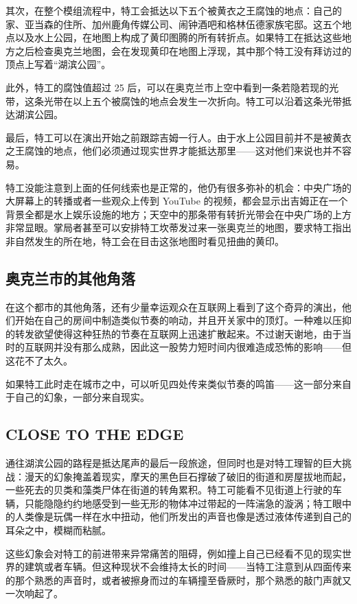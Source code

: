 其次，在整个模组流程中，特工会抵达以下五个被黄衣之王腐蚀的地点：自己的家、亚当森的住所、加州鹿角传媒公司、闹钟酒吧和格林伍德家族宅邸。这五个地点以及水上公园，在地图上构成了黄印图腾的所有转折点。如果特工在抵达这些地方之后检查奥克兰地图，会在发现黄印在地图上浮现，其中那个特工没有拜访过的顶点上写着“湖滨公园”。

此外，特工的腐蚀值超过 25 后，可以在奥克兰市上空中看到一条若隐若现的光带，这条光带在以上五个被腐蚀的地点会发生一次折向。特工可以沿着这条光带抵达湖滨公园。

最后，特工可以在演出开始之前跟踪吉姆一行人。由于水上公园目前并不是被黄衣之王腐蚀的地点，他们必须通过现实世界才能抵达那里——这对他们来说也并不容易。

特工没能注意到上面的任何线索也是正常的，他仍有很多弥补的机会：中央广场的大屏幕上的转播或者一些观众上传到 YouTube 的视频，都会显示出吉姆正在一个背景全都是水上娱乐设施的地方；天空中的那条带有转折光带会在中央广场的上方非常显眼。掌局者甚至可以安排特工坎蒂发过来一张奥克兰的地图，要求特工指出非自然发生的所在地，特工会在目击这张地图时看见扭曲的黄印。

\subsection{奥克兰市的其他角落}

在这个都市的其他角落，还有少量幸运观众在互联网上看到了这个奇异的演出，他们开始在自己的房间中制造类似节奏的响动，并且开关家中的顶灯。一种难以压抑的转发欲望使得这种狂热的节奏在互联网上迅速扩散起来。不过谢天谢地，由于当时的互联网并没有那么成熟，因此这一股势力短时间内很难造成恐怖的影响——但这花不了太久。

如果特工此时走在城市之中，可以听见四处传来类似节奏的鸣笛——这一部分来自于自己的幻象，一部分来自现实。

\subsection{CLOSE TO THE EDGE}

通往湖滨公园的路程是抵达尾声的最后一段旅途，但同时也是对特工理智的巨大挑战：漫天的幻象掩盖着现实，摩天的黑色巨石撑破了破旧的街道和房屋拔地而起，一些死去的贝类和藻类尸体在街道的转角累积。特工可能看不见街道上行驶的车辆，只能隐隐约约地感受到一些无形的物体冲过带起的一阵湍急的漩涡；特工眼中的人类像是玩偶一样在水中扭动，他们所发出的声音也像是透过液体传递到自己的耳朵之中，模糊而粘腻。

这些幻象会对特工的前进带来异常痛苦的阻碍，例如撞上自己已经看不见的现实世界的建筑或者车辆。但这种现状不会维持太长的时间——当特工注意到从四面传来的那个熟悉的声音时，或者被擦身而过的车辆撞至昏厥时，那个熟悉的敲门声就又一次响起了。

